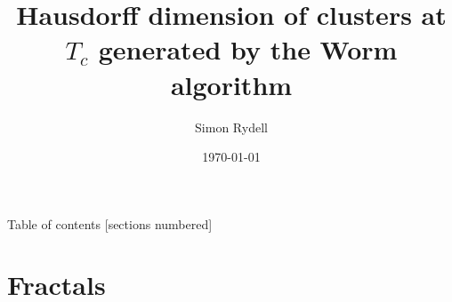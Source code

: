\documentclass[10pt]{beamer}
\title{Hausdorff dimension of clusters at $T_c$ generated by the Worm algorithm}
\date{\today}
\date{}
\author{Simon Rydell}
\institute{Royal Institute of Technology, Stockholm}
\begin{document}
\maketitle

\begin{frame}{Table of contents}
  [sections numbered]
  \tableofcontents[hideallsubsections]
\end{frame}

\section{Fractals}


\end{document}
